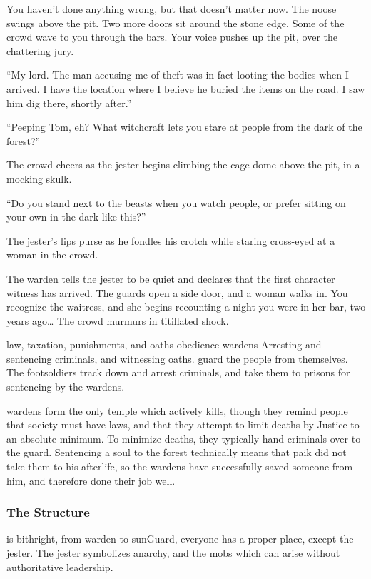 \begin{multicols}{2}
{    You haven't done anything wrong, but that doesn't matter now.
    The noose swings above the pit.
    Two more doors sit around the stone edge.
    Some of the crowd wave to you through the bars.
    Your voice pushes up the pit, over the chattering jury.

    ``My lord.
    The man accusing me of theft was in fact looting the bodies when I arrived.
    I have the location where I believe he buried the items on the road.
    I saw him dig there, shortly after.''

    {\sffamily ``Peeping Tom, eh?
    What \gls{witchcraft} lets you stare at people from the dark of the forest?''}

    The crowd cheers as the jester begins climbing the cage-dome above the pit, in a mocking skulk.

    {\sffamily ``Do you stand next to the beasts when you watch people, or prefer sitting on your own in the dark like this?''}

    The jester's lips purse as he fondles his crotch while staring cross-eyed at a woman in the crowd.

    The \gls{warden} tells the jester to be quiet and declares that the first character witness has arrived.
    The guards open a side door, and a woman walks in.
    You recognize the waitress, and she begins recounting a night you were in her bar, two years ago\ldots
    The crowd murmurs in titillated shock.
  }%
  {law, taxation, punishments, and oaths}%
  {obedience}%
  {\Glspl{warden}}%
  {
    Arresting and sentencing criminals, and witnessing oaths.
  }%
guard the people from themselves.
The footsoldiers track down and arrest criminals, and take them to prisons for sentencing by the \glspl{warden}.

\Glspl{warden} form the only temple which actively kills, though they remind people that society must have laws, and that they attempt to limit deaths by Justice to an absolute minimum.
To minimize deaths, they typically hand criminals over to the \gls{guard}.
Sentencing a soul to the forest technically means that \gls{paik} did not take them to his afterlife, so the \glspl{warden} have successfully saved someone from him, and therefore done their job well.

\subsubsection{The Structure}
is bithright, from \gls{warden} to \gls{sunGuard}, everyone has a proper place, except the jester.
The jester symbolizes anarchy, and the mobs which can arise without authoritative leadership.


\end{multicols}
